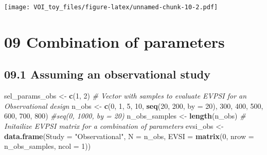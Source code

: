 \documentclass[
]{article}
\newenvironment{Shaded}{\begin{snugshade}}{\end{snugshade}}
\newcommand{\CommentTok}[1]{\textcolor[rgb]{0.56,0.35,0.01}{\textit{#1}}}
\newcommand{\DataTypeTok}[1]{\textcolor[rgb]{0.13,0.29,0.53}{#1}}
\newcommand{\DecValTok}[1]{\textcolor[rgb]{0.00,0.00,0.81}{#1}}
\newcommand{\KeywordTok}[1]{\textcolor[rgb]{0.13,0.29,0.53}{\textbf{#1}}}
\newcommand{\NormalTok}[1]{#1}
\newcommand{\StringTok}[1]{\textcolor[rgb]{0.31,0.60,0.02}{#1}}
\begin{document}
\texttt{[image: VOI\_toy\_files/figure-latex/unnamed-chunk-10-2.pdf]}

\hypertarget{combination-of-parameters}{%
\section{09 Combination of parameters}\label{combination-of-parameters}}

\hypertarget{assuming-an-observational-study}{%
\subsection{09.1 Assuming an observational
study}\label{assuming-an-observational-study}}

\begin{Shaded}
\begin{Highlighting}[]
\NormalTok{sel_params_obs <-}\StringTok{ }\KeywordTok{c}\NormalTok{(}\DecValTok{1}\NormalTok{, }\DecValTok{2}\NormalTok{)}
\CommentTok{# Vector with samples to evaluate EVPSI for an Observational design}
\NormalTok{n_obs <-}\StringTok{ }\KeywordTok{c}\NormalTok{(}\DecValTok{0}\NormalTok{, }\DecValTok{1}\NormalTok{, }\DecValTok{5}\NormalTok{, }\DecValTok{10}\NormalTok{, }\KeywordTok{seq}\NormalTok{(}\DecValTok{20}\NormalTok{, }\DecValTok{200}\NormalTok{, }\DataTypeTok{by =} \DecValTok{20}\NormalTok{), }\DecValTok{300}\NormalTok{, }\DecValTok{400}\NormalTok{, }\DecValTok{500}\NormalTok{, }\DecValTok{600}\NormalTok{, }\DecValTok{700}\NormalTok{, }\DecValTok{800}\NormalTok{) }\CommentTok{#seq(0, 1000, by = 20)}
\NormalTok{n_obs_samples <-}\StringTok{ }\KeywordTok{length}\NormalTok{(n_obs)}
\CommentTok{# Initailize EVPSI matrix for a combination of parameters}
\NormalTok{evsi_obs <-}\StringTok{ }\KeywordTok{data.frame}\NormalTok{(}\DataTypeTok{Study =} \StringTok{"Observational"}\NormalTok{, }
                        \DataTypeTok{N =}\NormalTok{ n_obs, }
                        \DataTypeTok{EVSI =} \KeywordTok{matrix}\NormalTok{(}\DecValTok{0}\NormalTok{, }\DataTypeTok{nrow =}\NormalTok{ n_obs_samples, }\DataTypeTok{ncol =} \DecValTok{1}\NormalTok{))}


\end{Highlighting}
\end{Shaded}
\end{document}
